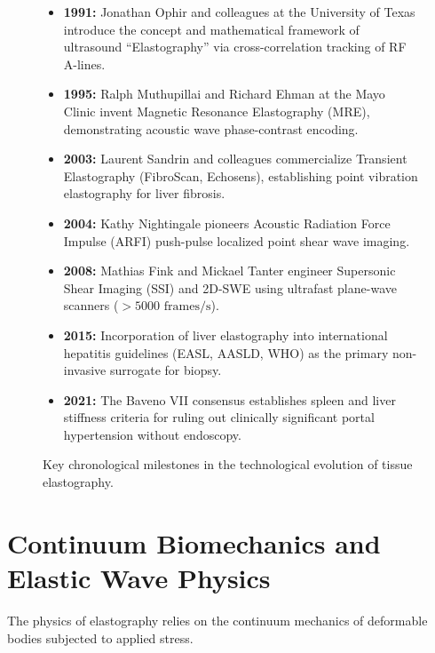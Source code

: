 \documentclass[11pt,a4paper]{article}
\begin{document}
\begin{figure}[htbp]
\centering
\begin{tcolorbox}[colback=teal!5!white,colframe=teal!60!black,title=\textbf{Chronological Milestones in the Evolution of Elastography},width=\linewidth]
\small
\begin{itemize}[leftmargin=1.5em]
    \item \textbf{1991:} Jonathan Ophir and colleagues at the University of Texas introduce the concept and mathematical framework of ultrasound ``Elastography'' via cross-correlation tracking of RF A-lines.
    \item \textbf{1995:} Ralph Muthupillai and Richard Ehman at the Mayo Clinic invent Magnetic Resonance Elastography (MRE), demonstrating acoustic wave phase-contrast encoding.
    \item \textbf{2003:} Laurent Sandrin and colleagues commercialize Transient Elastography (FibroScan, Echosens), establishing point vibration elastography for liver fibrosis.
    \item \textbf{2004:} Kathy Nightingale pioneers Acoustic Radiation Force Impulse (ARFI) push-pulse localized point shear wave imaging.
    \item \textbf{2008:} Mathias Fink and Mickael Tanter engineer Supersonic Shear Imaging (SSI) and 2D-SWE using ultrafast plane-wave scanners ($> 5000\text{ frames/s}$).
    \item \textbf{2015:} Incorporation of liver elastography into international hepatitis guidelines (EASL, AASLD, WHO) as the primary non-invasive surrogate for biopsy.
    \item \textbf{2021:} The Baveno VII consensus establishes spleen and liver stiffness criteria for ruling out clinically significant portal hypertension without endoscopy.
\end{itemize}
\end{tcolorbox}
\caption{Key chronological milestones in the technological evolution of tissue elastography.}
\label{fig:elastography_milestones}
\end{figure}

\section{Continuum Biomechanics and Elastic Wave Physics}
The physics of elastography relies on the continuum mechanics of deformable bodies subjected to applied stress.
\end{document}
